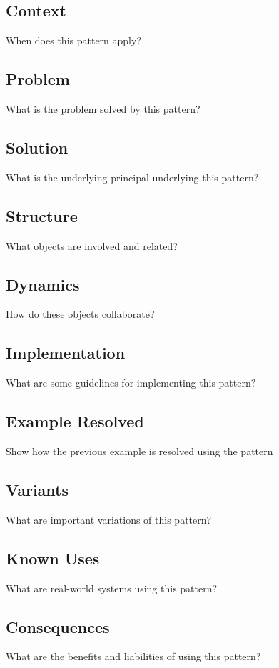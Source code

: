 \documentclass{article}
\begin{document}
\subsection{Context}
When does this pattern apply?

\subsection{Problem}
What is the problem solved by this pattern?

\subsection{Solution}
What is the underlying principal underlying this pattern?

\subsection{Structure}
What objects are involved and related?

\subsection{Dynamics}
How do these objects collaborate?

\subsection{Implementation}
What are some guidelines for implementing this pattern?

\subsection{Example Resolved}
Show how the previous example is resolved using the pattern

\subsection{Variants}
What are important variations of this pattern?

\subsection{Known Uses}
What are real-world systems using this pattern?

\subsection{Consequences}
What are the benefits and liabilities of using this pattern?
\end{document}
